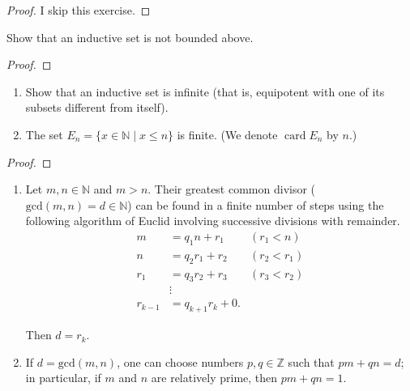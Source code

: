\begin{proof}
    I skip this exercise.
\end{proof}
\newpage

\begin{exercise}
    Show that an inductive set is not bounded above.
\end{exercise}

\begin{proof}
\end{proof}
\newpage

\begin{exercise}
    \begin{enumerate}[label={(\alph*)}]
        \item Show that an inductive set is infinite (that is, equipotent with one of its subsets different from itself).
        \item The set $E_{n} = \{ x\in\mathbb{N} \mid x\leq n \}$ is finite. (We denote $\operatorname{card} E_{n}$ by $n$.)
    \end{enumerate}
\end{exercise}

\begin{proof}
\end{proof}
\newpage

\begin{exercise}
    \begin{enumerate}[label={(\alph*)}]
        \item Let $m, n \in \mathbb{N}$ and $m > n$. Their greatest common divisor ($\text{gcd}(m, n) = d \in \mathbb{N}$) can be found in a finite number of steps using the following algorithm of Euclid involving successive divisions with remainder.
        \begin{align*}
            m & = q_{1}n + r_{1} & (r_{1} < n) \\
            n & = q_{2}r_{1} + r_{2} & (r_{2} < r_{1}) \\
            r_{1} & = q_{3}r_{2} + r_{3} & (r_{3} < r_{2}) \\
                  & \vdots \\
            r_{k-1} & = q_{k+1}r_{k} + 0.
        \end{align*}

        Then $d = r_{k}$.
        \item If $d = \text{gcd}(m, n)$, one can choose numbers $p, q \in \mathbb{Z}$ such that $pm + qn = d$; in particular, if $m$ and $n$ are relatively prime, then $pm + qn = 1$.
    \end{enumerate}
\end{exercise}

